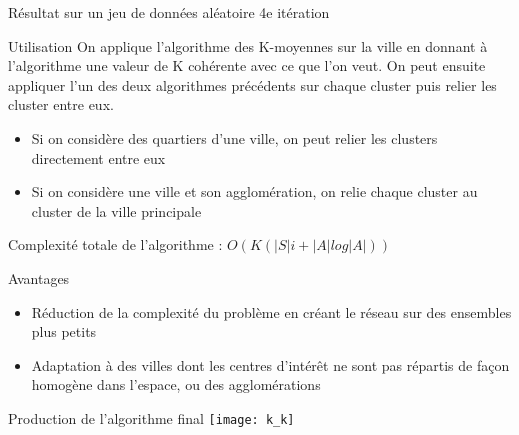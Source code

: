 \documentclass[aspectratio=43,11pt]{beamer}
\begin{document}
\begin{frame}{Résultat sur un jeu de données aléatoire}
{        4e itération
    }
\end{frame}
\begin{frame}{Utilisation}
    On applique l'algorithme des K-moyennes sur la ville en donnant à l'algorithme une valeur de K cohérente avec ce que l'on veut.
    On peut ensuite appliquer l'un des deux algorithmes précédents sur chaque cluster puis relier les cluster entre eux.
    \begin{itemize}
        \item Si on considère des quartiers d'une ville, on peut relier les clusters directement entre eux
        \item Si on considère une ville et son agglomération, on relie chaque cluster au cluster de la ville principale
    \end{itemize}
    Complexité totale de l'algorithme : $O(K (|S| i + |A| log |A|))$
\end{frame}
\begin{frame}{Avantages}
    \begin{itemize}
        \item Réduction de la complexité du problème en créant le réseau sur des ensembles plus petits
        \item Adaptation à des villes dont les centres d'intérêt ne sont pas répartis de façon homogène dans l'espace, ou des agglomérations
    \end{itemize}
\end{frame}
\begin{frame}{Production de l'algorithme final}
    \centering
        \texttt{[image: k\_k]}
\end{frame}
\end{document}
